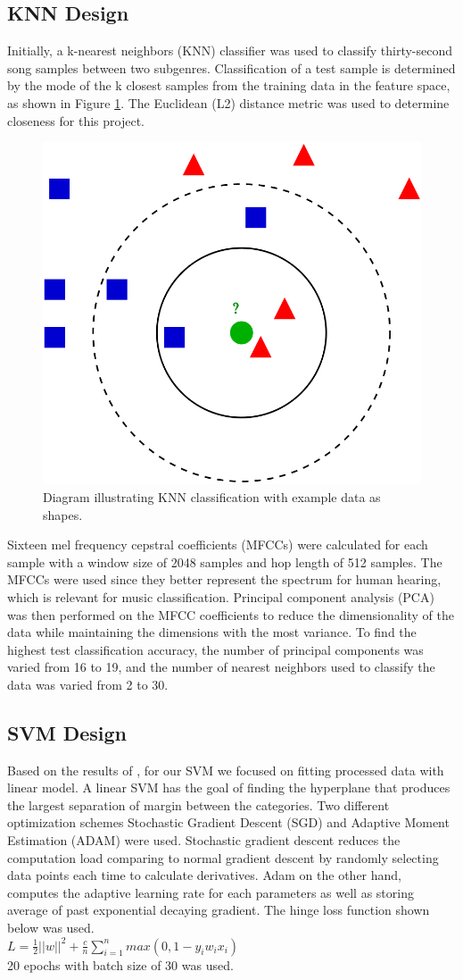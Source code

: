 \documentclass[letterpaper, 12 pt, conference]{ieeeconf}  %
\begin{document}
\subsection{KNN Design}

Initially, a k-nearest neighbors (KNN) classifier was used to classify thirty-second song samples between two subgenres. 
Classification of a test sample is determined by the mode of the k closest samples from the training data in the feature space, as shown in Figure \ref{fig:knnimg}. The Euclidean (L2) distance metric was used to determine closeness for this project.
\begin{figure}[!ht]
  \centering
  \includegraphics[width=.3\textwidth]{knn_graphic.png}
  \caption{Diagram illustrating KNN classification with example data as shapes.}
  \label{fig:knnimg}
\end{figure}

Sixteen mel frequency cepstral coefficients (MFCCs) were calculated for each sample with a window size of 2048 samples and hop length of 512 samples. The MFCCs were used since they better represent the spectrum for human hearing, which is relevant for music classification. Principal component analysis (PCA) was then performed on the MFCC coefficients to reduce the dimensionality of the data while maintaining the dimensions with the most variance. To find the highest test classification accuracy, the number of principal components was varied from 16 to 19, and the number of nearest neighbors used to classify the data was varied from 2 to 30. 

\subsection{SVM Design}
Based on the results of \cite{c7}, for our SVM we focused on fitting processed data with linear model. A linear SVM has the goal of finding the hyperplane that produces the largest separation of margin between the categories. Two different optimization schemes Stochastic Gradient Descent (SGD) and Adaptive Moment Estimation (ADAM) were used. Stochastic gradient descent reduces the computation load comparing to normal gradient descent by randomly selecting data points each time to calculate derivatives. Adam on the other hand, computes the adaptive learning rate for each parameters as well as storing average of past exponential decaying gradient. The hinge loss function shown below was used.\\
$L = \frac{1}{2} ||w||^2 + \frac{c}{n}\sum_{i=1}^{n}max(0,1-y_iw_ix_i) $\\
20 epochs with batch size of 30 was used. 
\end{document}
